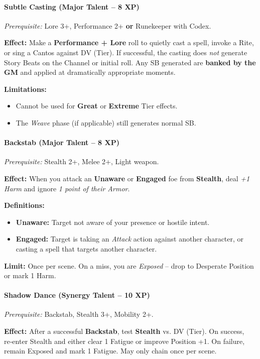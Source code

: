 \paragraph{Subtle Casting (Major Talent -- 8 XP)}
\textit{Prerequisite:} Lore 3+, Performance 2+ \textbf{or} Runekeeper with Codex.

\noindent \textbf{Effect:} Make a \textbf{Performance + Lore} roll to quietly cast a spell, invoke a Rite, or sing a Cantos against DV (Tier). If successful, the casting does \textit{not} generate Story Beats on the Channel or initial roll. Any SB generated are \textbf{banked by the GM} and applied at dramatically appropriate moments.

\noindent \textbf{Limitations:}
\begin{itemize}
    \item Cannot be used for \textbf{Great} or \textbf{Extreme} Tier effects.
    \item The \emph{Weave} phase (if applicable) still generates normal SB.
\end{itemize}

\paragraph{Backstab (Major Talent -- 8 XP)}
\textit{Prerequisite:} Stealth 2+, Melee 2+, Light weapon.

\noindent \textbf{Effect:} When you attack an \textbf{Unaware} or \textbf{Engaged} foe from \textbf{Stealth}, deal \emph{+1 Harm} and ignore \emph{1 point of their Armor}.

\noindent \textbf{Definitions:}
\begin{itemize}
    \item \textbf{Unaware:} Target not aware of your presence or hostile intent.
    \item \textbf{Engaged:} Target is taking an \emph{Attack} action against another character, or casting a spell that targets another character.
\end{itemize}
\noindent \textbf{Limit:} Once per scene. On a miss, you are \emph{Exposed} -- drop to Desperate Position or mark 1 Harm.

\paragraph{Shadow Dance (Synergy Talent -- 10 XP)}
\textit{Prerequisite:} Backstab, Stealth 3+, Mobility 2+.

\noindent \textbf{Effect:} After a successful \textbf{Backstab}, test \textbf{Stealth} vs. DV (Tier). On success, re‑enter Stealth and either clear 1 Fatigue or improve Position +1. On failure, remain Exposed and mark 1 Fatigue. May only chain once per scene.

